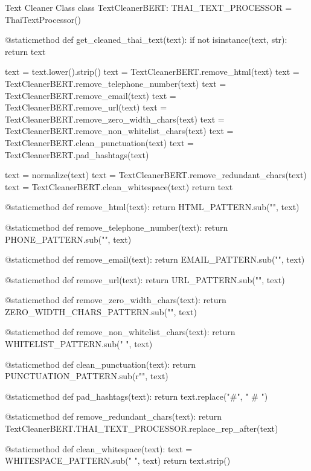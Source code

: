 \documentclass[12pt, a4paper]{article}
\begin{document}
            \begin{codeblock}{Text Cleaner Class}
                class TextCleanerBERT:
                    THAI_TEXT_PROCESSOR = ThaiTextProcessor()

                    @staticmethod
                    def get_cleaned_thai_text(text):
                        if not isinstance(text, str):
                            return text

                        text = text.lower().strip()
                        text = TextCleanerBERT.remove_html(text)
                        text = TextCleanerBERT.remove_telephone_number(text)
                        text = TextCleanerBERT.remove_email(text)
                        text = TextCleanerBERT.remove_url(text)
                        text = TextCleanerBERT.remove_zero_width_chars(text)
                        text = TextCleanerBERT.remove_non_whitelist_chars(text)
                        text = TextCleanerBERT.clean_punctuation(text)
                        text = TextCleanerBERT.pad_hashtags(text)

                        text = normalize(text)
                        text = TextCleanerBERT.remove_redundant_chars(text)
                        text = TextCleanerBERT.clean_whitespace(text)
                        return text

                    @staticmethod
                    def remove_html(text):
                        return HTML_PATTERN.sub("", text)

                    @staticmethod
                    def remove_telephone_number(text):
                        return PHONE_PATTERN.sub("", text)

                    @staticmethod
                    def remove_email(text):
                        return EMAIL_PATTERN.sub("", text)

                    @staticmethod
                    def remove_url(text):
                        return URL_PATTERN.sub("", text)

                    @staticmethod
                    def remove_zero_width_chars(text):
                        return ZERO_WIDTH_CHARS_PATTERN.sub("", text)

                    @staticmethod
                    def remove_non_whitelist_chars(text):
                        return WHITELIST_PATTERN.sub(" ", text)

                    @staticmethod
                    def clean_punctuation(text):
                        return PUNCTUATION_PATTERN.sub(r"\1", text)

                    @staticmethod
                    def pad_hashtags(text):
                        return text.replace("#", " # ")

                    @staticmethod
                    def remove_redundant_chars(text):
                        return TextCleanerBERT.THAI_TEXT_PROCESSOR.replace_rep_after(text)

                    @staticmethod
                    def clean_whitespace(text):
                        text = WHITESPACE_PATTERN.sub(" ", text)
                        return text.strip()
            \end{codeblock}
\end{document}
